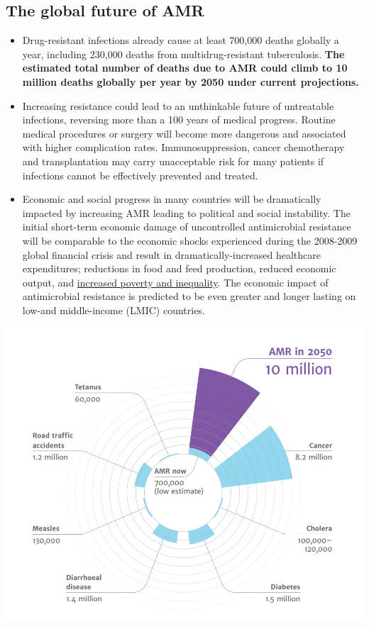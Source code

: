 \documentclass[
  11pt,
  paper=a4,
  ,captions=tableheading
]{scrartcl}
\providecommand{\tightlist}{%
  \setlength{\itemsep}{0pt}\setlength{\parskip}{0pt}}
\begin{document}
\hypertarget{the-global-future-of-amr}{%
\subsection*{The global future of AMR}\label{the-global-future-of-amr}}

\begin{itemize}
\tightlist
\item
  Drug-resistant infections already cause at least 700,000 deaths
  globally a year, including 230,000 deaths from multidrug-resistant
  tuberculosis. \textbf{The estimated total number of deaths due to AMR
  could climb to 10 million deaths globally per year by 2050 under
  current projections.}
\item
  Increasing resistance could lead to an unthinkable future of
  untreatable infections, reversing more than a 100 years of medical
  progress. Routine medical procedures or surgery will become more
  dangerous and associated with higher complication rates.
  Immunosuppression, cancer chemotherapy and transplantation may carry
  unacceptable risk for many patients if infections cannot be
  effectively prevented and treated.
\item
  Economic and social progress in many countries will be dramatically
  impacted by increasing AMR leading to political and social
  instability. The initial short-term economic damage of uncontrolled
  antimicrobial resistance will be comparable to the economic shocks
  experienced during the 2008-2009 global financial crisis and result in
  dramatically-increased healthcare expenditures; reductions in food and
  feed production, reduced economic output, and
  \href{https://documents.worldbank.org/en/publication/documents-reports/documentdetail/323311493396993758/final-report}{increased
  poverty and inequality}. The economic impact of antimicrobial
  resistance is predicted to be even greater and longer lasting on
  low-and middle-income (LMIC) countries.
\end{itemize}

\includegraphics[width=6.25in,height=\textheight]{images/AMR_deaths_2050.png}
\end{document}
